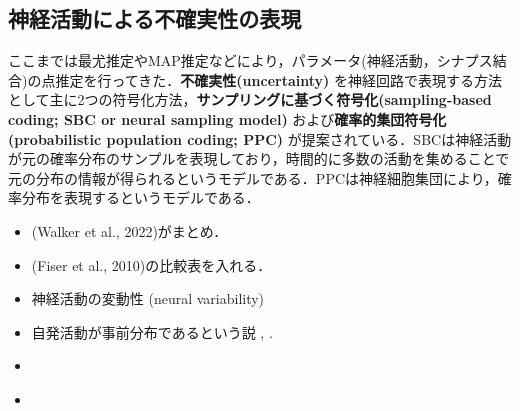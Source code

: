 \subsection{神経活動による不確実性の表現}
ここまでは最尤推定やMAP推定などにより，パラメータ(神経活動，シナプス結合)の点推定を行ってきた．\textbf{不確実性(uncertainty)} を神経回路で表現する方法として主に2つの符号化方法，\textbf{サンプリングに基づく符号化(sampling-based coding; SBC or neural sampling model)} および\textbf{確率的集団符号化(probabilistic population coding; PPC)} が提案されている．SBCは神経活動が元の確率分布のサンプルを表現しており，時間的に多数の活動を集めることで元の分布の情報が得られるというモデルである．PPCは神経細胞集団により，確率分布を表現するというモデルである．
\begin{itemize}
\item (Walker et al., 2022)がまとめ．
\item (Fiser et al., 2010)の比較表を入れる．
\item 神経活動の変動性 (neural variability)
\item 自発活動が事前分布であるという説 \citep{Fiser2010-kw}, \citep{Berkes2011-it}.
\item \citep{Hoyer2002-ci}
\item \citep{Sanborn2016-en}
\end{itemize}
